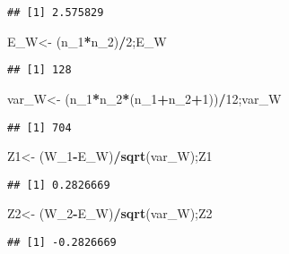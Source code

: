 \documentclass[
]{article}
\newenvironment{Shaded}{\begin{snugshade}}{\end{snugshade}}
\newcommand{\DecValTok}[1]{\textcolor[rgb]{0.00,0.00,0.81}{#1}}
\newcommand{\FunctionTok}[1]{\textcolor[rgb]{0.13,0.29,0.53}{\textbf{#1}}}
\newcommand{\NormalTok}[1]{#1}
\newcommand{\OtherTok}[1]{\textcolor[rgb]{0.56,0.35,0.01}{#1}}
\newcommand{\SpecialCharTok}[1]{\textcolor[rgb]{0.81,0.36,0.00}{\textbf{#1}}}
\begin{document}
\begin{verbatim}
## [1] 2.575829
\end{verbatim}

\begin{Shaded}
\begin{Highlighting}[]
\NormalTok{E\_W}\OtherTok{\textless{}{-}}\NormalTok{ (n\_1}\SpecialCharTok{*}\NormalTok{n\_2)}\SpecialCharTok{/}\DecValTok{2}\NormalTok{;E\_W}
\end{Highlighting}
\end{Shaded}

\begin{verbatim}
## [1] 128
\end{verbatim}

\begin{Shaded}
\begin{Highlighting}[]
\NormalTok{var\_W}\OtherTok{\textless{}{-}}\NormalTok{  (n\_1}\SpecialCharTok{*}\NormalTok{n\_2}\SpecialCharTok{*}\NormalTok{(n\_1}\SpecialCharTok{+}\NormalTok{n\_2}\SpecialCharTok{+}\DecValTok{1}\NormalTok{))}\SpecialCharTok{/}\DecValTok{12}\NormalTok{;var\_W}
\end{Highlighting}
\end{Shaded}

\begin{verbatim}
## [1] 704
\end{verbatim}

\begin{Shaded}
\begin{Highlighting}[]
\NormalTok{Z1}\OtherTok{\textless{}{-}}\NormalTok{ (W\_1}\SpecialCharTok{{-}}\NormalTok{E\_W)}\SpecialCharTok{/}\FunctionTok{sqrt}\NormalTok{(var\_W);Z1}
\end{Highlighting}
\end{Shaded}

\begin{verbatim}
## [1] 0.2826669
\end{verbatim}

\begin{Shaded}
\begin{Highlighting}[]
\NormalTok{Z2}\OtherTok{\textless{}{-}}\NormalTok{ (W\_2}\SpecialCharTok{{-}}\NormalTok{E\_W)}\SpecialCharTok{/}\FunctionTok{sqrt}\NormalTok{(var\_W);Z2}
\end{Highlighting}
\end{Shaded}

\begin{verbatim}
## [1] -0.2826669
\end{verbatim}
\end{document}
